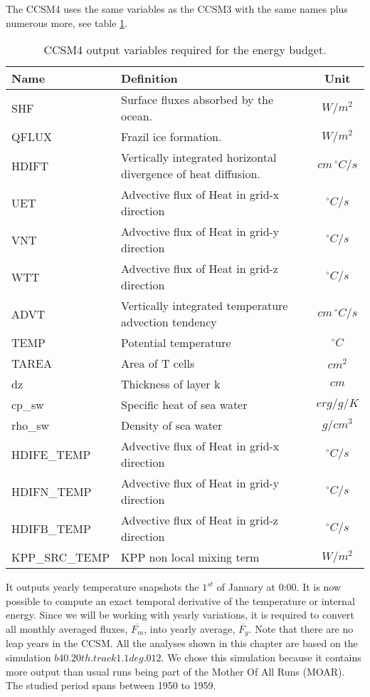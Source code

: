 The CCSM4 uses the same variables as the CCSM3 with the same names plus numerous more, see table \ref{var4}. 
\begin{table}
\centering
\begin{tabular}{l | l | c}
\hline
 Name  & Definition & Unit \\
\hline
  SHF  & 	Surface fluxes absorbed by the ocean. 	& $W/m^2$  \\
  QFLUX  &    Frazil ice formation.				& $W/m^2$  \\
  HDIFT  &    Vertically integrated horizontal divergence of heat diffusion.	& $cm \, ^\circ C/s$\\
  UET & 	Advective flux of Heat in grid-x direction	&	$^\circ C/s$	\\
  VNT& 	Advective flux of Heat in grid-y direction	&	$^\circ C/s$	\\
  WTT & 	Advective flux of Heat in grid-z direction	&	$^\circ C/s$	\\
  ADVT & 	Vertically integrated temperature advection tendency & $cm \, ^\circ C/s$ \\
  TEMP   & Potential temperature &   $^\circ C$ \\ 
  TAREA & Area of T cells & $cm^2$ \\
  dz & Thickness of layer k & $cm$ \\
  cp\_sw & Specific heat of sea water & $erg/g/K$\\
  rho\_sw & Density of sea water & $g/cm^3$\\
     HDIFE\_TEMP & 	Advective flux of Heat in grid-x direction	&	$^\circ C/s$	\\
  HDIFN\_TEMP & 	Advective flux of Heat in grid-y direction	&	$^\circ C/s$	\\
  HDIFB\_TEMP & 	Advective flux of Heat in grid-z direction	&	$^\circ C/s$	\\
  KPP\_SRC\_TEMP & 	KPP non local mixing term	&	$W/m^2$
\end{tabular}
\caption{CCSM4 output variables required for the energy budget.} \label{var4}
\end{table}

It outputs yearly temperature snapshots the $1^{st}$ of January at 0:00. It is now possible to compute an exact temporal derivative of the temperature or internal energy. Since we will be working with yearly variations, it is required to convert all monthly averaged fluxes, $\overline{F_m}$, into yearly average, $\overline{F_y}$. Note that there are no leap years in the CCSM. All the analyses shown in this chapter are based on the simulation $b40.20th.track1.1deg.012$. We chose this simulation because it contains more output than usual runs being part of the Mother Of All Runs (MOAR). The studied period spans between 1950 to 1959.

